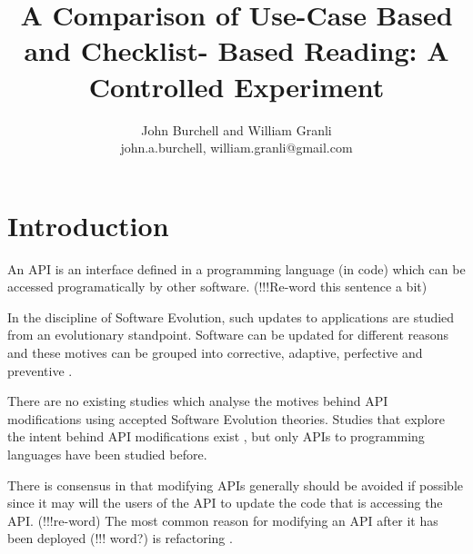 \documentclass[10pt,twocolumn]{article}
\begin{document}
\title{A Comparison of Use-Case Based and Checklist-
Based Reading: A Controlled Experiment}

\author{John Burchell and William Granli \\
john.a.burchell, william.granli@gmail.com}


\maketitle
\thispagestyle{empty}


\section{Introduction}
An API is an interface defined in a programming language (in code) which can be accessed programatically by other software. (!!!Re-word this sentence a bit) %

In the discipline of Software Evolution, such updates to applications are studied from an evolutionary standpoint. Software can be updated for different reasons and these motives can be grouped into corrective, adaptive, perfective and preventive \cite{lientz1980software}. %

There are no existing studies which analyse the motives behind API modifications using accepted Software Evolution theories. Studies that explore the intent behind API modifications exist \cite{hou2011exploring}, but only APIs to programming languages have been studied before.  %

There is consensus in that modifying APIs generally should be avoided if possible \cite{google_talk} \cite{mcdonnell2013empirical} \cite{robbes2012developers} \cite{henning2007api} \cite{robbes2012developers} since it may will the users of the API to update the code that is accessing the API. (!!!re-word) The most common reason for modifying an API after it has been deployed (!!! word?) is refactoring \cite{dig2005role} \cite{xing2006refactoring}. %
\end{document}
